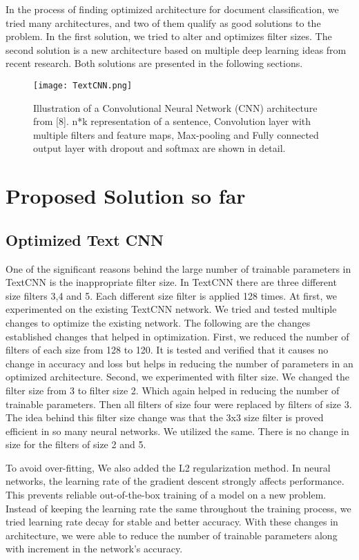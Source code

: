 \documentclass[conference]{IEEEtran}
\begin{document}
In the process of finding optimized architecture for document classification, we tried many architectures, and two of them qualify as good solutions to the problem. In the first solution, we tried to alter and optimizes filter sizes. The second solution is a new architecture based on multiple deep learning ideas from recent research. Both solutions are presented in the following sections.

\begin{figure*}[htbp]
\centerline{\texttt{[image: TextCNN.png]}}
\caption{Illustration of a Convolutional Neural Network (CNN) architecture from [8]. n*k representation of a sentence, Convolution layer with multiple filters and feature maps, Max-pooling and Fully connected output layer with dropout and softmax are shown in detail.}
\label{fig}
\end{figure*}

\section{Proposed Solution so far}
\subsection{Optimized Text CNN}
One of the significant reasons behind the large number of trainable parameters in TextCNN is the inappropriate filter size. In TextCNN there are three different size filters 3,4 and 5. Each different size filter is applied 128 times. 
At first, we experimented on the existing TextCNN network. We tried and tested multiple changes to optimize the existing network. The following are the changes established changes that helped in optimization.
First, we reduced the number of filters of each size from 128 to 120. It is tested and verified that it causes no change in accuracy and loss but helps in reducing the number of parameters in an optimized architecture.
Second, we experimented with filter size. We changed the filter size from 3 to filter size 2. Which again helped in reducing the number of trainable parameters. Then all filters of size four were replaced by filters of size 3. The idea behind this filter size change was that the 3x3 size filter is proved efficient in so many neural networks. We utilized the same. There is no change in size for the filters of size 2 and 5. 

To avoid over-fitting, We also added the L2 regularization method. In neural networks, the learning rate of the gradient descent strongly affects performance. This prevents reliable out-of-the-box training of a model on a new problem. Instead of keeping the learning rate the same throughout the training process, we tried learning rate decay for stable and better accuracy. With these changes in architecture, we were able to reduce the number of trainable parameters along with increment in the network's accuracy. 
\end{document}
